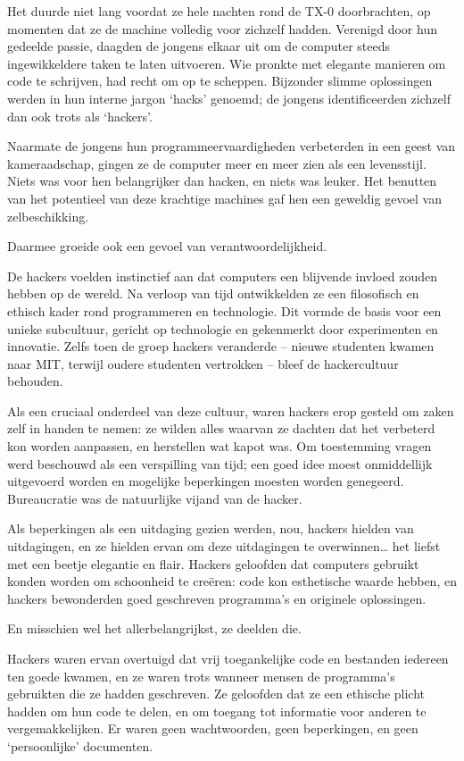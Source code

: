 \documentclass[smalldemyvopaper,11pt,twoside,onecolumn,openright,extrafontsizes,hidelinks]{memoir}
\begin{document}
Het duurde niet lang voordat ze hele nachten rond de TX-0 doorbrachten,
op momenten dat ze de machine volledig voor zichzelf hadden. Verenigd
door hun gedeelde passie, daagden de jongens elkaar uit om de computer
steeds ingewikkeldere taken te laten uitvoeren. Wie pronkte met elegante
manieren om code te schrijven, had recht om op te scheppen. Bijzonder
slimme oplossingen werden in hun interne jargon `hacks' genoemd; de
jongens identificeerden zichzelf dan ook trots als `hackers'.

Naarmate de jongens hun programmeervaardigheden verbeterden in een geest
van kameraadschap, gingen ze de computer meer en meer zien als een
levensstijl. Niets was voor hen belangrijker dan hacken, en niets was
leuker. Het benutten van het potentieel van deze krachtige machines gaf
hen een geweldig gevoel van zelbeschikking.

Daarmee groeide ook een gevoel van verantwoordelijkheid.

De hackers voelden instinctief aan dat computers een blijvende invloed
zouden hebben op de wereld. Na verloop van tijd ontwikkelden ze een
filosofisch en ethisch kader rond programmeren en technologie. Dit
vormde de basis voor een unieke subcultuur, gericht op technologie en
gekenmerkt door experimenten en innovatie. Zelfs toen de groep hackers
veranderde -- nieuwe studenten kwamen naar MIT, terwijl oudere studenten
vertrokken -- bleef de hackercultuur behouden.

Als een cruciaal onderdeel van deze cultuur, waren hackers erop gesteld
om zaken zelf in handen te nemen: ze wilden alles waarvan ze dachten dat
het verbeterd kon worden aanpassen, en herstellen wat kapot was. Om
toestemming vragen werd beschouwd als een verspilling van tijd; een goed
idee moest onmiddellijk uitgevoerd worden en mogelijke beperkingen
moesten worden genegeerd. Bureaucratie was de natuurlijke vijand van de
hacker.

Als beperkingen als een uitdaging gezien werden, nou, hackers hielden
van uitdagingen, en ze hielden ervan om deze uitdagingen te
overwinnen\ldots{} het liefst met een beetje elegantie en flair. Hackers
geloofden dat computers gebruikt konden worden om schoonheid te creëren:
code kon esthetische waarde hebben, en hackers bewonderden goed
geschreven programma's en originele oplossingen.

En misschien wel het allerbelangrijkst, ze deelden die.

Hackers waren ervan overtuigd dat vrij toegankelijke code en bestanden
iedereen ten goede kwamen, en ze waren trots wanneer mensen de
programma's gebruikten die ze hadden geschreven. Ze geloofden dat ze een
ethische plicht hadden om hun code te delen, en om toegang tot
informatie voor anderen te vergemakkelijken. Er waren geen wachtwoorden,
geen beperkingen, en geen `persoonlijke' documenten.
\end{document}
